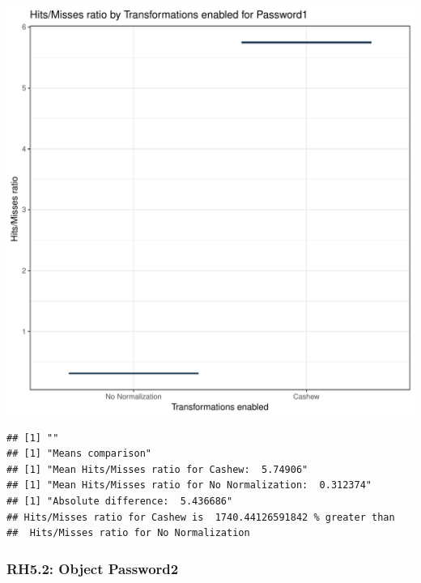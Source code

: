 \documentclass{article}\usepackage[]{graphicx}\usepackage[]{color}
\makeatletter
\def\maxwidth{ %
  \ifdim\Gin@nat@width>\linewidth
    \linewidth
  \else
    \Gin@nat@width
  \fi
}
\newenvironment{kframe}{%
 \def\at@end@of@kframe{}%
 \ifinner\ifhmode%
  \def\at@end@of@kframe{\end{minipage}}%
  \begin{minipage}{\columnwidth}%
 \fi\fi%
 \def\FrameCommand##1{\hskip\@totalleftmargin \hskip-\fboxsep
 \colorbox{shadecolor}{##1}\hskip-\fboxsep
     \hskip-\linewidth \hskip-\@totalleftmargin \hskip\columnwidth}%
 \MakeFramed {\advance\hsize-\width
   \@totalleftmargin\z@ \linewidth\hsize
   \@setminipage}}%
 {\par\unskip\endMakeFramed%
 \at@end@of@kframe}
\newenvironment{knitrout}{}{} %
\makeatother
\begin{document}
\begin{knitrout}
\color{fgcolor}
\includegraphics[width=\maxwidth]{figure/RH5_password-1} 
\begin{kframe}

{\ttfamily\noindent\bfseries\color{errorcolor}{\#\# Error in eval(expr, envir, enclos): object 'shap\_cashew\_password' not found}}\begin{verbatim}
## [1] ""
## [1] "Means comparison"
## [1] "Mean Hits/Misses ratio for Cashew:  5.74906"
## [1] "Mean Hits/Misses ratio for No Normalization:  0.312374"
## [1] "Absolute difference:  5.436686"
## Hits/Misses ratio for Cashew is  1740.44126591842 % greater than 
##  Hits/Misses ratio for No Normalization
\end{verbatim}
\end{kframe}
\end{knitrout}


\subsubsection{RH5.2: Object Password2}
\end{document}
